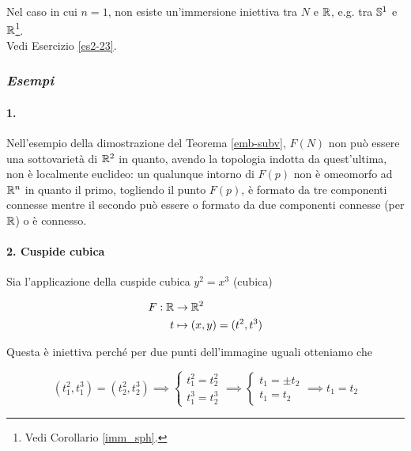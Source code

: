 Nel caso in cui $ n=1 $, non esiste un'immersione iniettiva tra $ N $ e $ \R $, e.g. tra $ \S^{1} $ e $ \R $\footnote{%
	Vedi Corollario \ref{imm_sph}.%
}.\\
Vedi Esercizio \ref{es2-23}.

\subsubsection{\textit{Esempi}}

\paragraph{1.}

Nell'esempio della dimostrazione del Teorema \ref{emb-subv}, $ F(N) $ non può essere una sottovarietà di $ \R^{2} $ in quanto, avendo la topologia indotta da quest'ultima, non è localmente euclideo: un qualunque intorno di $ F(p) $ non è omeomorfo ad $ \R^{n} $ in quanto il primo, togliendo il punto $ F(p) $, è formato da tre componenti connesse mentre il secondo può essere o formato da due componenti connesse (per $ \R $) o è connesso.

\paragraph{2. Cuspide cubica}

Sia l'applicazione della cuspide cubica $ y^{2} = x^{3} $ (cubica)

\begin{align}
	\begin{split}
		F : \R &\to \R^{2}\\
		t &\mapsto (x,y) = (t^{2},t^{3})
	\end{split}
\end{align}

Questa è iniettiva perché per due punti dell'immagine uguali otteniamo che

\begin{equation}
	(t_{1}^{2},t_{1}^{3}) = (t_{2}^{2},t_{2}^{3})%
	\implies%
	\begin{cases}
		t_{1}^{2} = t_{2}^{2}\\
		t_{1}^{3} = t_{2}^{3}
	\end{cases}%
	\implies%
	\begin{cases}
		t_{1} = \pm t_{2}\\
		t_{1} = t_{2}
	\end{cases}%
	\implies%
	t_{1} = t_{2}
\end{equation}

